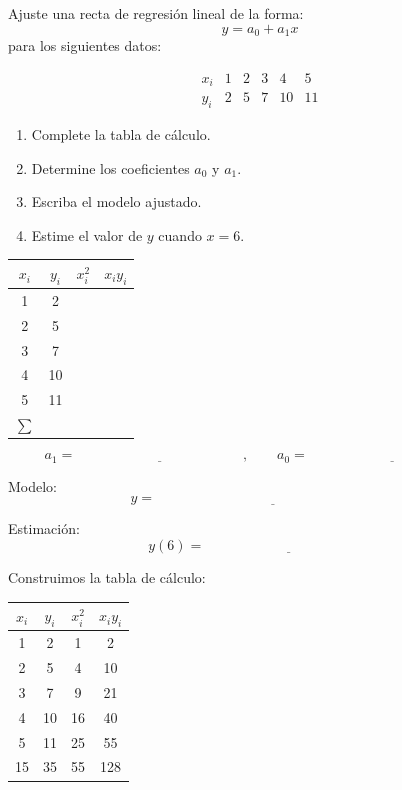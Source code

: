 \documentclass[11pt,respuestas,a4]{aleph-examen}
\begin{document}
\begin{preguntas}

\item
Ajuste una recta de regresión lineal de la forma: 
\[
y=a_0+a_1x
\]
para los siguientes datos:

\[
\begin{array}{c|ccccc}
x_i & 1 & 2 & 3 & 4 & 5 \\
\hline
y_i & 2 & 5 & 7 & 10 & 11
\end{array}
\]

\begin{enumerate}[label=\alph*)]
    \item Complete la tabla de cálculo.
    \item Determine los coeficientes $a_0$ y $a_1$.
    \item Escriba el modelo ajustado.
    \item Estime el valor de $y$ cuando $x=6$.
\end{enumerate}

\begin{center}
\renewcommand{\arraystretch}{1.4}
\begin{tabular}{c|c|c|c}
\toprule
$x_i$ & $y_i$ & $x_i^2$ & $x_iy_i$ \\
\midrule
1 & 2 &  &  \\
2 & 5 &  &  \\
3 & 7 &  &  \\
4 & 10 &  &  \\
5 & 11 &  &  \\
\midrule
$\sum$ &  &  &  \\
\bottomrule
\end{tabular}
\end{center}

\[
a_1=\underline{\hspace{5cm}}, 
\qquad
a_0=\underline{\hspace{5cm}}
\]

Modelo:
\[
y=\underline{\hspace{7cm}}
\]

Estimación:
\[
y(6)=\underline{\hspace{5cm}}
\]

\begin{respuesta}
Construimos la tabla de cálculo:

\begin{center}
\renewcommand{\arraystretch}{1.4}
\begin{tabular}{c|c|c|c}
\toprule
$x_i$ & $y_i$ & $x_i^2$ & $x_iy_i$ \\
\midrule
1 & 2 & 1 & 2 \\
2 & 5 & 4 & 10 \\
3 & 7 & 9 & 21 \\
4 & 10 & 16 & 40 \\
5 & 11 & 25 & 55 \\
\midrule
15 & 35 & 55 & 128 \\
\bottomrule
\end{tabular}
\end{center}


\end{respuesta}
\end{preguntas}
\end{document}
